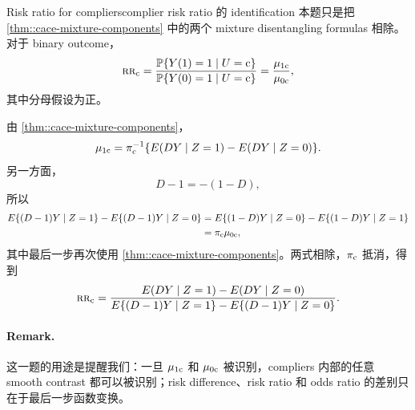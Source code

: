 \begin{exercisesolution}{Risk ratio for compliers}{complier risk ratio 的 identification}
本题只是把 \cref{thm::cace-mixture-components} 中的两个 mixture disentangling formulas 相除。对于 binary outcome，
\[
\textsc{rr}_{\textup{c}}
=
\frac{\mathbb{P}\{Y(1)=1\mid U=\textup{c}\}}
     {\mathbb{P}\{Y(0)=1\mid U=\textup{c}\}}
=
\frac{\mu_{1\textup{c}}}{\mu_{0\textup{c}}},
\]
其中分母假设为正。

由 \cref{thm::cace-mixture-components}，
\[
\mu_{1\textup{c}}
=
\pi_{\textup{c}}^{-1}\{E(DY\mid Z=1)-E(DY\mid Z=0)\}.
\]
另一方面，
\[
D-1=-(1-D),
\]
所以
\begin{align*}
E\{(D-1)Y\mid Z=1\}-E\{(D-1)Y\mid Z=0\}
&=
E\{(1-D)Y\mid Z=0\}-E\{(1-D)Y\mid Z=1\}\\
&=
\pi_{\textup{c}}\mu_{0\textup{c}},
\end{align*}
其中最后一步再次使用 \cref{thm::cace-mixture-components}。两式相除，$\pi_{\textup{c}}$ 抵消，得到
\[
\textsc{rr}_{\textup{c}}
=
\frac{E(DY\mid Z=1)-E(DY\mid Z=0)}
       {E\{(D-1)Y\mid Z=1\}-E\{(D-1)Y\mid Z=0\}}.
\]

\paragraph{Remark.}
这一题的用途是提醒我们：一旦 $\mu_{1\textup{c}}$ 和 $\mu_{0\textup{c}}$ 被识别，compliers 内部的任意 smooth contrast 都可以被识别；risk difference、risk ratio 和 odds ratio 的差别只在于最后一步函数变换。
\end{exercisesolution}

